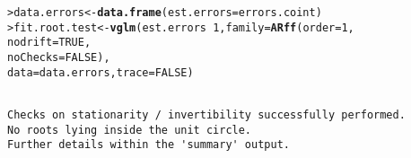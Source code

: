 \documentclass[a4paper, 11pt]{article}\usepackage[]{graphicx}\usepackage[]{color}
\makeatletter
\newcommand{\hlnum}[1]{\textcolor[rgb]{0.686,0.059,0.569}{#1}}%
\newcommand{\hlopt}[1]{\textcolor[rgb]{0,0,0}{#1}}%
\newcommand{\hlstd}[1]{\textcolor[rgb]{0.345,0.345,0.345}{#1}}%
\newcommand{\hlkwb}[1]{\textcolor[rgb]{0.69,0.353,0.396}{#1}}%
\newcommand{\hlkwc}[1]{\textcolor[rgb]{0.333,0.667,0.333}{#1}}%
\newcommand{\hlkwd}[1]{\textcolor[rgb]{0.737,0.353,0.396}{\textbf{#1}}}%
\newenvironment{kframe}{%
 \def\at@end@of@kframe{}%
 \ifinner\ifhmode%
  \def\at@end@of@kframe{\end{minipage}}%
  \begin{minipage}{\columnwidth}%
 \fi\fi%
 \def\FrameCommand##1{\hskip\@totalleftmargin \hskip-\fboxsep
 \colorbox{shadecolor}{##1}\hskip-\fboxsep
     \hskip-\linewidth \hskip-\@totalleftmargin \hskip\columnwidth}%
 \MakeFramed {\advance\hsize-\width
   \@totalleftmargin\z@ \linewidth\hsize
   \@setminipage}}%
 {\par\unskip\endMakeFramed%
 \at@end@of@kframe}
\newenvironment{knitrout}{}{} %
\newcommand{\Rcol}{{\color{blue} {\large \texttt{R}}}~}
\makeatother
\begin{document}
\begin{knitrout}\footnotesize
{}\color{fgcolor}\begin{kframe}
\begin{alltt}
\hlstd{> }    \hlstd{data.errors}   \hlkwb{<-} \hlkwd{data.frame}\hlstd{(}\hlkwc{est.errors} \hlstd{= errors.coint)}
\hlstd{> }    \hlstd{fit.root.test} \hlkwb{<-} \hlkwd{vglm}\hlstd{(est.errors} \hlopt{~} \hlnum{1}\hlstd{,} \hlkwc{family} \hlstd{=} \hlkwd{ARff}\hlstd{(}\hlkwc{order} \hlstd{=} \hlnum{1}\hlstd{,}
\hlstd{  }                                                        \hlkwc{nodrift} \hlstd{=} \hlnum{TRUE}\hlstd{,}
\hlstd{  }                                                        \hlkwc{noChecks} \hlstd{=} \hlnum{FALSE}\hlstd{),}
\hlstd{  }                          \hlkwc{data} \hlstd{= data.errors,} \hlkwc{trace} \hlstd{=} \hlnum{FALSE}\hlstd{)}
\end{alltt}
\begin{verbatim}

Checks on stationarity / invertibility successfully performed. 
No roots lying inside the unit circle. 
Further details within the 'summary' output.
\end{verbatim}
\end{kframe}
\end{knitrout}


 
\end{document}
